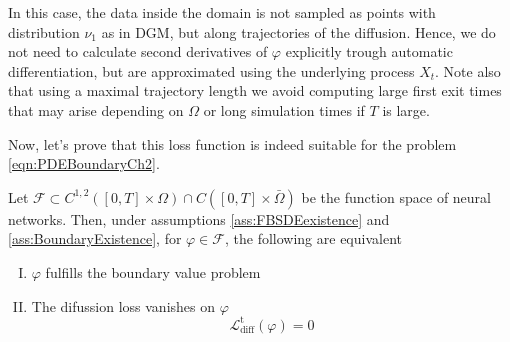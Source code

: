 In this case, the data inside the domain is not sampled as points with distribution $\nu_1$ as in DGM, but along trajectories of the diffusion. Hence, we do not need to calculate second derivatives of $\varphi$ explicitly trough automatic differentiation, but are approximated using the underlying process $X_t$. Note also that using a maximal trajectory length we avoid computing large first exit times that may arise depending on $\Omega$ or long simulation times if $T$ is large. 

Now, let's prove that this loss function is indeed suitable for the problem \eqref{eqn:PDEBoundaryCh2}.
\begin{theorem}
	Let $\mathcal{F}\subset C^{1,2}([0,T]\times \Omega) \cap C([0,T]\times \bar{\Omega})$ be the function space of neural networks. Then, under assumptions \ref{ass:FBSDEexistence} and \ref{ass:BoundaryExistence}, for $\varphi\in \mathcal{F}$, the following are equivalent
	\begin{enumerate}[I.]
		\item $\varphi$ fulfills the boundary value problem
		\item The difussion loss vanishes on $\varphi$ 
		\begin{equation}
			\mathcal{L}_{\text{diff}}^{\mathrm{t}}(\varphi)=0
		\end{equation}
	\end{enumerate}
\end{theorem}
